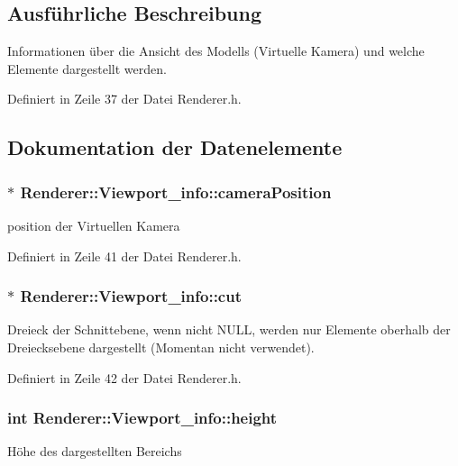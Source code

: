 \subsection{Ausführliche Beschreibung}
Informationen über die Ansicht des Modells (Virtuelle Kamera) und welche Elemente dargestellt werden. 

Definiert in Zeile 37 der Datei Renderer.\-h.



\subsection{Dokumentation der Datenelemente}
\hypertarget{structRenderer_1_1Viewport__info_aa6b5d9d9dbde8c74e25af98680b7ccce}{
\subsubsection[{camera\-Position}]{$\ast$ Renderer\-::\-Viewport\-\_\-info\-::camera\-Position}}\label{structRenderer_1_1Viewport__info_aa6b5d9d9dbde8c74e25af98680b7ccce}
position der Virtuellen Kamera 

Definiert in Zeile 41 der Datei Renderer.\-h.

\hypertarget{structRenderer_1_1Viewport__info_af6fe77b0bf872e7d65079bb58e9e8cce}{
\subsubsection[{cut}]{$\ast$ Renderer\-::\-Viewport\-\_\-info\-::cut}}\label{structRenderer_1_1Viewport__info_af6fe77b0bf872e7d65079bb58e9e8cce}
Dreieck der Schnittebene, wenn nicht N\-U\-L\-L, werden nur Elemente oberhalb der Dreiecksebene dargestellt (Momentan nicht verwendet). 

Definiert in Zeile 42 der Datei Renderer.\-h.

\hypertarget{structRenderer_1_1Viewport__info_acd3f381981791f2b012129fe54aee39c}{
\subsubsection[{height}]{\setlength{\rightskip}{0pt plus 5cm}int Renderer\-::\-Viewport\-\_\-info\-::height}}\label{structRenderer_1_1Viewport__info_acd3f381981791f2b012129fe54aee39c}
Höhe des dargestellten Bereichs 

